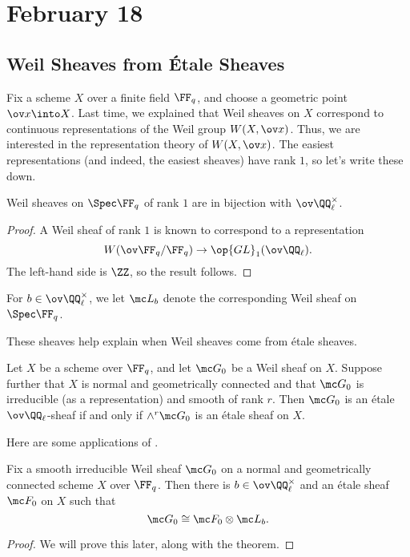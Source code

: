 \documentclass[../notes.tex]{subfiles}
\begin{document}
\section{February 18}

\subsection{Weil Sheaves from \'Etale Sheaves}
Fix a scheme $X$ over a finite field $\FF_q$, and choose a geometric point $\ov x\into X$. Last time, we explained that Weil sheaves on $X$ correspond to continuous representations of the Weil group $W(X,\ov x)$. Thus, we are interested in the representation theory of $W(X,\ov x)$. The easiest representations (and indeed, the easiest sheaves) have rank $1$, so let's write these down.
\begin{proposition}
	Weil sheaves on $\Spec\FF_q$ of rank $1$ are in bijection with $\ov\QQ_\ell^\times$.
\end{proposition}
\begin{proof}
	A Weil sheaf of rank $1$ is known to correspond to a representation
	\[W(\ov\FF_q/\FF_q)\to\op{GL}_1(\ov\QQ_\ell).\]
	The left-hand side is $\ZZ$, so the result follows.
\end{proof}
\begin{notation}
	For $b\in\ov\QQ_\ell^\times$, we let $\mc L_b$ denote the corresponding Weil sheaf on $\Spec\FF_q$.
\end{notation}
These sheaves help explain when Weil sheaves come from \'etale sheaves.
\begin{theorem} \label{thm:weil-to-et-sheaf}
	Let $X$ be a scheme over $\FF_q$, and let $\mc G_0$ be a Weil sheaf on $X$. Suppose further that $X$ is normal and geometrically connected and that $\mc G_0$ is irreducible (as a representation) and smooth of rank $r$. Then $\mc G_0$ is an \'etale $\ov\QQ_\ell$-sheaf if and only if $\land^r\mc G_0$ is an \'etale sheaf on $X$.
\end{theorem}
Here are some applications of .
\begin{corollary}
	Fix a smooth irreducible Weil sheaf $\mc G_0$ on a normal and geometrically connected scheme $X$ over $\FF_q$. Then there is $b\in\ov\QQ_\ell^\times$ and an \'etale sheaf $\mc F_0$ on $X$ such that
	\[\mc G_0\cong\mc F_0\otimes\mc L_b.\]
\end{corollary}
\begin{proof}
	We will prove this later, along with the theorem.
\end{proof}
\end{document}
